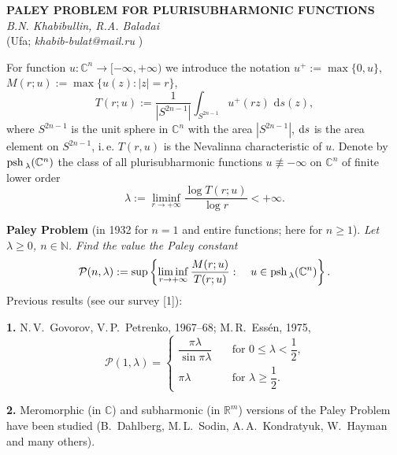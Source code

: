 \begin{center}{ \bf  PALEY PROBLEM FOR PLURISUBHARMONIC FUNCTIONS}\\
{\it B.N. Khabibullin, R.A. Baladai} \\
(Ufa; {\it khabib-bulat@mail.ru} )
\end{center}

For function $u\colon {\mathbb C}^n\to [-\infty,+\infty)$ we introduce the notation  $u^+:=\max\{0, u\}$,
$M(r;u):=\max \bigl\{u(z)\colon |z|=r\bigr\}$,
\begin{equation*}
 T(r;u):=\frac{1}{|S^{2n-1}|}
\int_{S^{2n-1}} u^+ (rz)\, {\,\mathrm d} s(z),
\end{equation*}
where $S^{2n-1}$ is the unit sphere in  $\mathbb C^n$ with the area $|S^{2n-1}|$, ${\rm d}s$ is the area element on $S^{2n-1}$, i.\,e. $T(r,u)$ is the Nevalinna characteristic of $u$.
Denote by ${\rm psh\,}_{\lambda}(\mathbb C^n)$ the class of  all pluri\-sub\-ha\-r\-m\-o\-nic functions $u\not\equiv -\infty$ on $\mathbb C^n$ of finite  lower order
\begin{equation*}
 \lambda:=\liminf_{r\to +\infty}\frac{\log T(r;u)}{\log r}<+\infty .
\end{equation*}

\noindent
{\bf Paley Problem} (in 1932 for $n=1$ and entire functions; here for $n\geq 1$). {\it Let $\lambda \geq 0$, $n\in {\mathbb N}$.  Find the value the Paley constant
\begin{equation*}
\mathcal  P(n,\lambda):=\sup\left\{ \liminf_{r\to +\infty} \frac{M (r;u)}{T(r;u)}\, \colon \quad {u\in {\rm psh\,}_{\lambda}(\mathbb C^n)}\right\} .
\end{equation*}
}
Previous results (see our survey [1]):

\noindent
{\bf 1.} N.\,V.~Govorov, V.\,P.~Petrenko, 1967--68; M.\,R.~Ess\'en, 1975,
	\begin{equation*}
	\mathcal  P(1, \lambda)=\begin{cases}
	\dfrac{\pi \lambda}{\sin \pi \lambda} &\quad \text{for $0\leq \lambda <\dfrac{1}{2}$,}\\
	\pi \lambda &\quad \text{for $\lambda \geq \dfrac{1}{2}$.}
	\end{cases}
	\end{equation*}

\noindent
 {\bf 2.} Meromorphic (in ${\mathbb C}$) and subharmonic (in ${\mathbb R}^m$) versions of the Paley Problem have been studied (B.~Dahlberg, M.\,L.~Sodin,  A.\,A.~Kondratyuk, W.~Hayman and many others).

